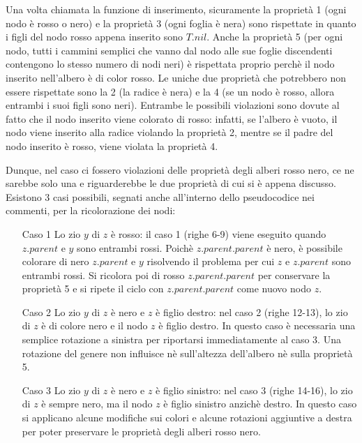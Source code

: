

Una volta chiamata la funzione di inserimento, sicuramente la proprietà 1 (ogni nodo è rosso o nero) e la proprietà 3 (ogni foglia è nera) sono rispettate in quanto i figli del nodo rosso appena inserito sono \(T.nil\). Anche la proprietà 5 (per ogni nodo, tutti i cammini semplici che vanno dal nodo alle sue foglie discendenti contengono lo stesso numero di nodi neri) è rispettata proprio perchè il nodo inserito nell'albero è di color rosso. Le uniche due proprietà che potrebbero non essere rispettate sono la 2 (la radice è nera) e la 4 (se un nodo è rosso, allora entrambi i suoi figli sono neri). Entrambe le possibili violazioni sono dovute al fatto che il nodo inserito viene colorato di rosso: infatti, se l'albero è vuoto, il nodo viene inserito alla radice violando la proprietà 2, mentre se il padre del nodo inserito è rosso, viene violata la proprietà 4. 

Dunque, nel caso ci fossero violazioni delle proprietà degli alberi rosso nero, ce ne sarebbe solo una e riguarderebbe le due proprietà di cui si è appena discusso. Esistono 3 casi possibili, segnati anche all'interno dello pseudocodice nei commenti, per la ricolorazione dei nodi:
\begin{enumerate}
  \item[Caso 1] Lo zio \(y\) di \(z\) è rosso: il caso 1 (righe 6-9) viene eseguito quando \(z.parent\) e \(y\) sono entrambi rossi. Poichè \(z.parent.parent\) è nero, è possibile colorare di nero \(z.parent\) e \(y\) risolvendo il problema per cui \(z\) e \(z.parent\) sono entrambi rossi. Si ricolora poi di rosso \(z.parent.parent\) per conservare la proprietà 5 e si ripete il ciclo  con \(z.parent.parent\) come nuovo nodo \(z\).
  \item[Caso 2] Lo zio \(y\) di \(z\) è nero e \(z\) è figlio destro: nel caso 2 (righe 12-13), lo zio di \(z\) è di colore nero e il nodo \(z\) è figlio destro. In questo caso è necessaria una semplice rotazione a sinistra per riportarsi immediatamente al caso 3. Una rotazione del genere non influisce nè sull'altezza dell'albero nè sulla proprietà 5.
  \item[Caso 3] Lo zio \(y\) di \(z\) è nero e \(z\) è figlio sinistro: nel caso 3 (righe 14-16), lo zio di \(z\) è sempre nero, ma il nodo \(z\) è figlio sinistro anzichè destro. In questo caso si applicano alcune modifiche sui colori e alcune rotazioni aggiuntive a destra per poter preservare le proprietà degli alberi rosso nero. 
\end{enumerate}

